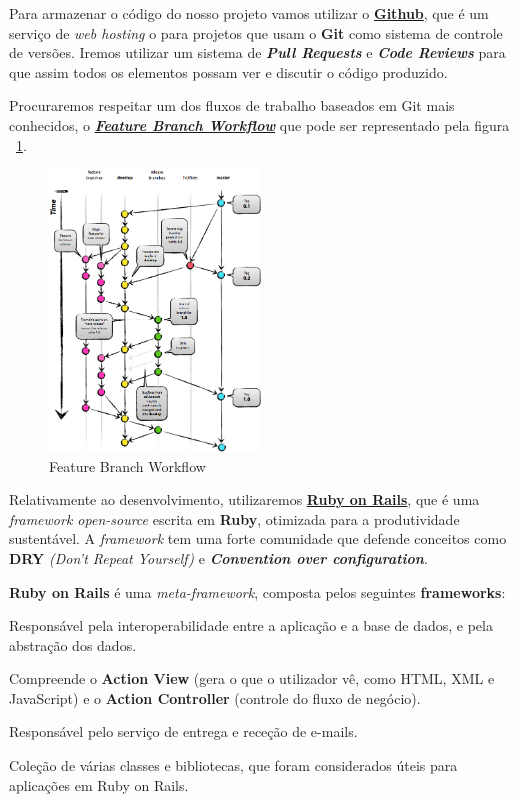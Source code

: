 Para armazenar o código do nosso projeto vamos utilizar o \href{http://github.com}{\textbf{Github}}, 
que é um serviço de \textit{web hosting} o para projetos que usam o \textbf{Git} como sistema de controle de versões. 
Iremos utilizar um sistema de \textit{\textbf{Pull Requests}} e \textit{\textbf{Code Reviews}} 
para que assim todos os elementos possam ver e discutir o código produzido.

Procuraremos respeitar um dos fluxos de trabalho baseados em Git mais conhecidos, 
o \href{https://www.atlassian.com/git/workflows#!workflow-feature-branch}{\textbf{\textit{Feature Branch Workflow}}} 
que pode ser representado pela figura ~\ref{fig:git-workflow}.

\begin{figure}[H] 
  \centering
  \includegraphics[width=0.5\textwidth]{images/tecnologias/git-workflow}
  \caption{Feature Branch Workflow}
  \label{fig:git-workflow}
\end{figure}

Relativamente ao desenvolvimento, utilizaremos \href{http://rubyonrails.org/}{\textbf{Ruby on Rails}}, 
que é uma \textit{framework open-source} escrita em \textbf{Ruby}, otimizada para a produtividade sustentável. 
A \textit{framework} tem uma forte comunidade que defende conceitos como \textbf{DRY} \textit{(Don't Repeat Yourself)} 
e \textbf{\textit{Convention over configuration}}.

\textbf{Ruby on Rails} é uma \textit{meta-framework}, composta pelos seguintes \textbf{frameworks}:

\begin{description}[labelindent=1cm]
  \item[Active Record] Responsável pela interoperabilidade entre a aplicação e a base de dados, e pela abstração dos dados.
  \item[Action Pack] Compreende o \textbf{Action View} (gera o que o utilizador vê, como HTML, XML e JavaScript) 
  e o \textbf{Action Controller} (controle do fluxo de negócio).
  \item[Action Mailer] Responsável pelo serviço de entrega e receção de e-mails.
  \item[Active Support] Coleção de várias classes e bibliotecas, que foram considerados úteis para aplicações em Ruby on Rails.
\end{description}

